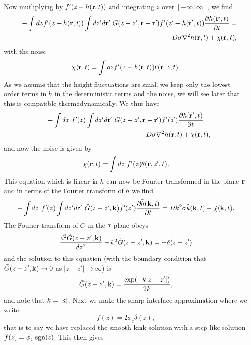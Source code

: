Now mutliplying by $f'(z-h({\bf r},t))$ and integrating $z$ over $[-\infty,\infty]$, we find
\begin{eqnarray}
&&-\int dz f'(z-h({\bf r},t))\int dz'd{\bf r}'\  G(z-z',{\bf r}-{\bf r}') f'(z'-h({\bf r}',t))\frac{\partial h({\bf r}',t)}{\partial t} = \\
&&-D\sigma \nabla^2 h({\bf r},t) + \chi({\bf r},t),
\end{eqnarray}
with the noise
\begin{equation}
    \chi({\bf r},t)= \int dz f'(z-h({\bf r},t)) \theta({\bf r},z,t).
\end{equation}
As we assume that the height fluctuations are small we keep only the lowest order terms in $h$ in the deterministic terms and the noise, we will see later that this is compatible thermodynamically. We thus have
\begin{eqnarray}
&&-\int dz \ f'(z)\int dz'd{\bf r}'\  G(z-z',{\bf r}-{\bf r}') f'(z')\frac{\partial h({\bf r}',t)}{\partial t} = \\
&&-D\sigma \nabla^2 h({\bf r},t) + \chi({\bf r},t),
\end{eqnarray}
and now  the noise is given by
\begin{equation}
    \chi({\bf r},t)= \int dz\  f'(z) \theta({\bf r},z',t).
\end{equation}
This equation which is linear in $h$ can now be Fourier transformed in the plane ${\bf r}$ and in terms of the Fourier transform of $h$ we find
\begin{equation}
    -\int dz \ f'(z)\int dz'd\br'\ \tilde G(z-z',\bk) f'(z')\frac{\partial\tilde h(\bk,t)}{\partial t} = Dk^2\sigma \tilde h(\bk,t) + \tilde \chi(\bk,t).
    \label{bstep}
\end{equation}
The Fourier transform of $G$ in the ${\bf r}$ plane obeys
\begin{equation}
    \frac{d^2 \tilde G(z-z',{\bf k} )}{dz^2}-k^2 \tilde G(z-z',{\bf k} )=-\delta(z-z')
\end{equation}
and the solution to this equation (with the boundary condition that $\tilde G(z-z',{\bf k} )\to 0$ as $|z-z'|\to\infty$)  is
\begin{equation}
    \tilde G(z-z',{\bf k}) = \frac{\exp(-k|z-z'|)}{2k},
\end{equation}
and note that $k=|{\bf k}|$. 
Next we make the sharp interface approximation where we write
\begin{equation}
    f(z) = 2\phi_c \delta(z),
    \label{sharp}
\end{equation}
that is to say we have replaced the smooth kink solution with a step like solution
$f(z) = \phi_c\  {\rm sgn}(z)$. This then gives
